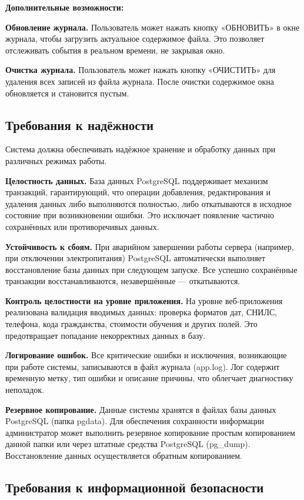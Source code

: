 \textbf{Дополнительные возможности:}

\textbf{Обновление журнала.} Пользователь может нажать кнопку «ОБНОВИТЬ» в окне журнала, чтобы загрузить актуальное содержимое файла. Это позволяет отслеживать события в реальном времени, не закрывая окно.

\textbf{Очистка журнала.} Пользователь может нажать кнопку «ОЧИСТИТЬ» для удаления всех записей из файла журнала. После очистки содержимое окна обновляется и становится пустым.

\subsection{Требования к надёжности}

Система должна обеспечивать надёжное хранение и обработку данных при различных режимах работы.

\textbf{Целостность данных.} База данных PostgreSQL поддерживает механизм транзакций, гарантирующий, что операции добавления, редактирования и удаления данных либо выполняются полностью, либо откатываются в исходное состояние при возникновении ошибки. Это исключает появление частично сохранённых или противоречивых данных.

\textbf{Устойчивость к сбоям.} При аварийном завершении работы сервера (например, при отключении электропитания) PostgreSQL автоматически выполняет восстановление базы данных при следующем запуске. Все успешно сохранённые транзакции восстанавливаются, незавершённые — откатываются.

\textbf{Контроль целостности на уровне приложения.} На уровне веб-приложения реализована валидация вводимых данных: проверка форматов дат, СНИЛС, телефона, кода гражданства, стоимости обучения и других полей. Это предотвращает попадание некорректных данных в базу.

\textbf{Логирование ошибок.} Все критические ошибки и исключения, возникающие при работе системы, записываются в файл журнала (app.log). Лог содержит временную метку, тип ошибки и описание причины, что облегчает диагностику неполадок.

\textbf{Резервное копирование.} Данные системы хранятся в файлах базы данных PostgreSQL (папка pgdata). Для обеспечения сохранности информации администратор может выполнить резервное копирование простым копированием данной папки или через штатные средства PostgreSQL (pg\_dump). Восстановление данных осуществляется обратным копированием.

\subsection{Требования к информационной безопасности}

